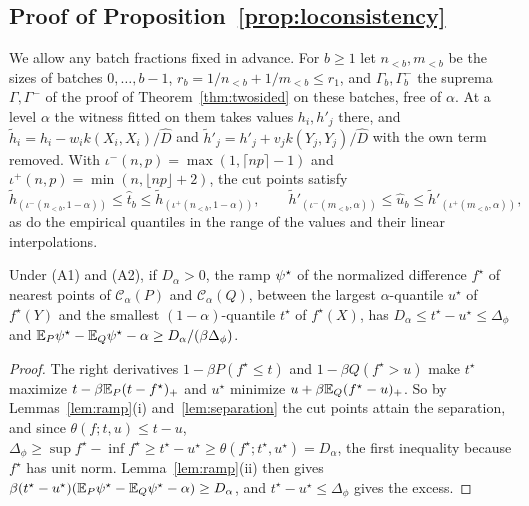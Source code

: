 \subsection{Proof of Proposition~\ref{prop:loconsistency}}

We allow any batch fractions fixed in advance. For $b\ge1$ let $n_{<b},m_{<b}$ be the sizes of batches $0,\dots,b-1$,
$r_b=1/n_{<b}+1/m_{<b}\le r_1$, and $\Gamma_b,\Gamma_b^-$ the suprema $\Gamma,\Gamma^-$ of the proof of
Theorem~\ref{thm:twosided} on these batches, free of $\alpha$. At a level $\alpha$ the witness fitted on them takes
values $h_i,h'_j$ there, and $\tilde h_i=h_i-w_ik(X_i,X_i)/\widehat D$ and
$\tilde h'_j=h'_j+v_jk(Y_j,Y_j)/\widehat D$ with the own term removed. With $\iota^-(n,p)=\max(1,\lceil np\rceil-1)$ and
$\iota^+(n,p)=\min(n,\lfloor np\rfloor+2)$, the cut points satisfy
\begin{equation}
\tilde h_{(\iota^-(n_{<b},1-\alpha))}\le\widehat t_b\le\tilde h_{(\iota^+(n_{<b},1-\alpha))},\qquad
\tilde h'_{(\iota^-(m_{<b},\alpha))}\le\widehat u_b\le\tilde h'_{(\iota^+(m_{<b},\alpha))},
\label{eq:cutrank}
\end{equation}
as do the empirical quantiles in the range of the values and their linear interpolations.

\begin{lemma}
\label{lem:popramp}
Under (A1) and (A2), if $D_\alpha>0$, the ramp $\psi^\star$ of the normalized difference $f^\star$ of nearest points of
$\mathcal C_\alpha(P)$ and $\mathcal C_\alpha(Q)$, between the largest $\alpha$-quantile $u^\star$ of $f^\star(Y)$ and the
smallest $(1-\alpha)$-quantile $t^\star$ of $f^\star(X)$, has $D_\alpha\le t^\star-u^\star\le \Delta_\phi$ and
$\mathbb{E}_P\psi^\star-\mathbb{E}_Q\psi^\star-\alpha\ge D_\alpha/(\beta \Delta_\phi)$.
\end{lemma}

\begin{proof}
The right derivatives $1-\beta P(f^\star\le t)$ and $1-\beta Q(f^\star>u)$ make $t^\star$ maximize
$t-\beta\mathbb{E}_P(t-f^\star)_+$ and $u^\star$ minimize $u+\beta\mathbb{E}_Q(f^\star-u)_+$. So by Lemmas~\ref{lem:ramp}(i)
and~\ref{lem:separation} the cut points attain the separation, and since $\theta(f;t,u)\le t-u$,
$\Delta_\phi\ge\sup f^\star-\inf f^\star\ge t^\star-u^\star\ge\theta(f^\star;t^\star,u^\star)=D_\alpha$, the first
inequality because $f^\star$ has unit norm. Lemma~\ref{lem:ramp}(ii) then gives
$\beta(t^\star-u^\star)(\mathbb{E}_P\psi^\star-\mathbb{E}_Q\psi^\star-\alpha)\ge D_\alpha$, and $t^\star-u^\star\le\Delta_\phi$ gives the
excess.
\end{proof}

